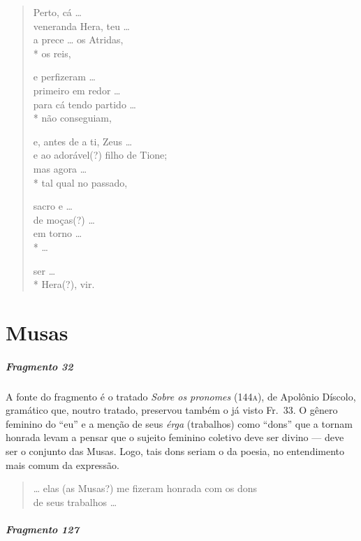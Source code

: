 \begin{verse}
Perto, cá \ldots{}\\
veneranda Hera, teu \ldots{}\\
a prece \ldots{} os Atridas,\\*
os reis,

e perfizeram \ldots{}\\
primeiro em redor \ldots{}\\
para cá tendo partido \ldots{}\\*
não conseguiam,

e, antes de a ti, Zeus \ldots{}\\
e ao adorável(?) filho de Tione;\\
mas agora \ldots{}\\*
tal qual no passado,

sacro e \ldots{}\\
de moças(?) \ldots{}\\
em torno \ldots{}\\*
\ldots{}

ser \ldots{}\\*
Hera(?), vir.
\end{verse}

\chapter{Musas}

\paragraph{Fragmento 32}

{\small A fonte do fragmento é o tratado \textit{Sobre os pronomes} (144\textsc{a}), de Apolônio
Díscolo, gramático que, noutro tratado, preservou também o já visto Fr.~33. O
gênero feminino do “eu” e a menção de seus \textit{érga }(trabalhos) como
``dons” que a tornam honrada levam a pensar que o sujeito feminino
coletivo deve ser divino --- deve ser o conjunto das Musas. Logo, tais dons
seriam o da poesia, no entendimento mais comum da expressão.}

\begin{verse}
\ldots{} elas (as Musas?) me fizeram honrada com os dons\\
de seus trabalhos \ldots{}
\end{verse}


\paragraph{Fragmento 127}

